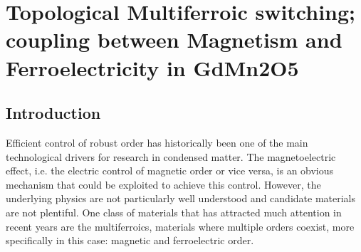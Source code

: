 \chapter{Topological Multiferroic switching; coupling between Magnetism and Ferroelectricity in GdMn2O5}
\section{Introduction}
Efficient control of robust order has historically been one of the main technological drivers for research in condensed matter.
The magnetoelectric effect, i.e. the electric control of magnetic order or vice versa, is an obvious mechanism that could be exploited to achieve this control\cite{Spaldin2019,Khomskii2009,Fiebig2005,Fiebig2016,Cheong2007}.
However, the underlying physics are not particularly well understood and candidate materials are not plentiful.
One class of materials that has attracted much attention in recent years are the multiferroics, materials where multiple orders coexist, more specifically in this case: magnetic and ferroelectric order.

